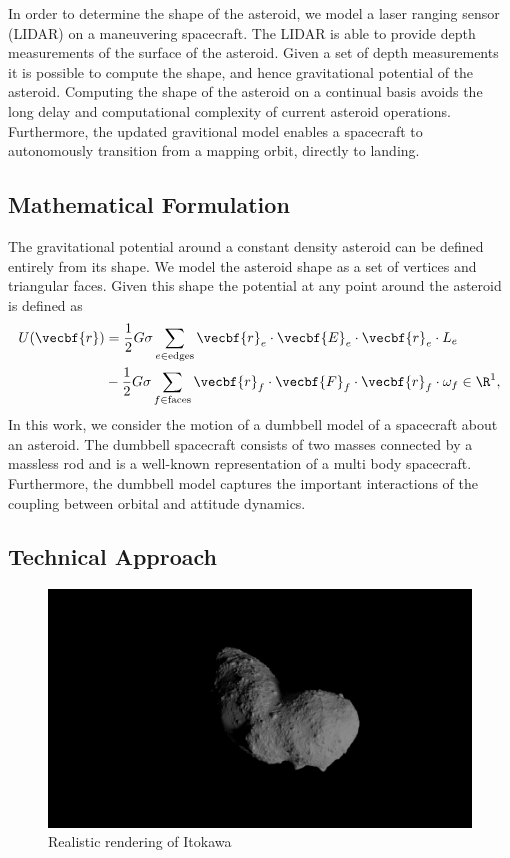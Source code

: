 \documentclass[11pt,reqno,twocolumn]{article} %
\begin{document}
In order to determine the shape of the asteroid, we model a laser ranging sensor (LIDAR) on a maneuvering spacecraft.
The LIDAR is able to provide depth measurements of the surface of the asteroid.
Given a set of depth measurements it is possible to compute the shape, and hence gravitational potential of the asteroid.
Computing the shape of the asteroid on a continual basis avoids the long delay and computational complexity of current asteroid operations.
Furthermore, the updated gravitional model enables a spacecraft to autonomously transition from a mapping orbit, directly to landing.

\subsection*{Mathematical Formulation}\label{se:mathematical_problem}
The gravitational potential around a constant density asteroid can be defined entirely from its shape.
We model the asteroid shape as a set of vertices and triangular faces.
Given this shape the potential at any point around the asteroid is defined as
\begin{align}\label{eq:potential}
    U(\vecbf{r}) &= \frac{1}{2} G \sigma \sum_{e \in \text{edges}} \vecbf{r}_e \cdot \vecbf{E}_e \cdot \vecbf{r}_e \cdot L_e \nonumber\\
                 &- \frac{1}{2}G \sigma \sum_{f \in \text{faces}} \vecbf{r}_f \cdot \vecbf{F}_f \cdot \vecbf{r}_f \cdot \omega_f \in \R^1,
\end{align}
In this work, we consider the motion of a dumbbell model of a spacecraft about an asteroid.
The dumbbell spacecraft consists of two masses connected by a massless rod and is a well-known representation of a multi body spacecraft.
Furthermore, the dumbbell model captures the important interactions of the coupling between orbital and attitude dynamics. 

\subsection*{Technical Approach}

\begin{figure}
    \centering
    \includegraphics[width=\columnwidth,trim={50mm 30mm 50mm 30mm},clip]{figures/itokawa_blender.png}
    \caption{Realistic rendering of Itokawa}
\end{figure}
\end{document}
